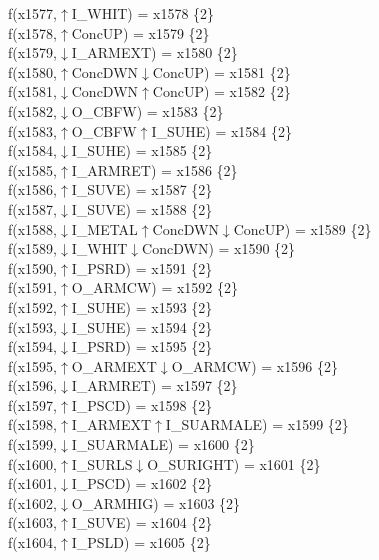 f(x1577,$\uparrow$I\_WHIT) = x1578 \{2\} \\  
f(x1578,$\uparrow$ConcUP) = x1579 \{2\} \\  
f(x1579,$\downarrow$I\_ARMEXT) = x1580 \{2\} \\  
f(x1580,$\uparrow$ConcDWN$\downarrow$ConcUP) = x1581 \{2\} \\  
f(x1581,$\downarrow$ConcDWN$\uparrow$ConcUP) = x1582 \{2\} \\  
f(x1582,$\downarrow$O\_CBFW) = x1583 \{2\} \\  
f(x1583,$\uparrow$O\_CBFW$\uparrow$I\_SUHE) = x1584 \{2\} \\  
f(x1584,$\downarrow$I\_SUHE) = x1585 \{2\} \\  
f(x1585,$\uparrow$I\_ARMRET) = x1586 \{2\} \\  
f(x1586,$\uparrow$I\_SUVE) = x1587 \{2\} \\  
f(x1587,$\downarrow$I\_SUVE) = x1588 \{2\} \\  
f(x1588,$\downarrow$I\_METAL$\uparrow$ConcDWN$\downarrow$ConcUP) = x1589 \{2\} \\  
f(x1589,$\downarrow$I\_WHIT$\downarrow$ConcDWN) = x1590 \{2\} \\  
f(x1590,$\uparrow$I\_PSRD) = x1591 \{2\} \\  
f(x1591,$\uparrow$O\_ARMCW) = x1592 \{2\} \\  
f(x1592,$\uparrow$I\_SUHE) = x1593 \{2\} \\  
f(x1593,$\downarrow$I\_SUHE) = x1594 \{2\} \\  
f(x1594,$\downarrow$I\_PSRD) = x1595 \{2\} \\  
f(x1595,$\uparrow$O\_ARMEXT$\downarrow$O\_ARMCW) = x1596 \{2\} \\  
f(x1596,$\downarrow$I\_ARMRET) = x1597 \{2\} \\  
f(x1597,$\uparrow$I\_PSCD) = x1598 \{2\} \\  
f(x1598,$\uparrow$I\_ARMEXT$\uparrow$I\_SUARMALE) = x1599 \{2\} \\  
f(x1599,$\downarrow$I\_SUARMALE) = x1600 \{2\} \\  
f(x1600,$\uparrow$I\_SURLS$\downarrow$O\_SURIGHT) = x1601 \{2\} \\  
f(x1601,$\downarrow$I\_PSCD) = x1602 \{2\} \\  
f(x1602,$\downarrow$O\_ARMHIG) = x1603 \{2\} \\  
f(x1603,$\uparrow$I\_SUVE) = x1604 \{2\} \\  
f(x1604,$\uparrow$I\_PSLD) = x1605 \{2\} \\  
